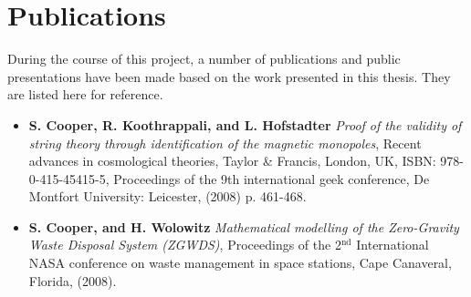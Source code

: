 \chapter*{Publications}
\label{chap:publications}

During the course of this project, a number of publications and public presentations have been made based on the work presented in this thesis. They are listed here for reference.

\begin{itemize}

  \item {\bf S. Cooper, R. Koothrappali, and L. Hofstadter} {\em Proof of the validity of string theory through identification of the magnetic monopoles}, Recent advances in cosmological theories, Taylor \& Francis, London, UK, ISBN: 978-0-415-45415-5, Proceedings of the 9th international geek conference, De Montfort University: Leicester, (2008) p. 461-468.

  \item {\bf S. Cooper, and H. Wolowitz} {\em Mathematical modelling of the Zero-Gravity Waste Disposal System (ZGWDS)}, Proceedings of the 2$^\textrm{{nd}}$ International NASA conference on waste management in space stations, Cape Canaveral, Florida, (2008).

\end{itemize}
